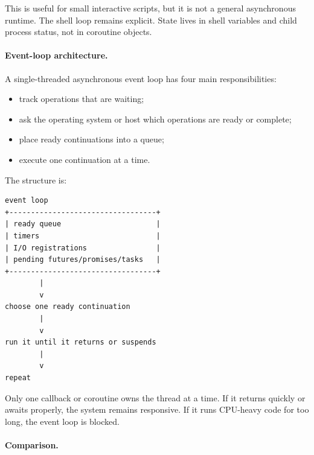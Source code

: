 This is useful for small interactive scripts, but it is not a general asynchronous runtime. The shell loop remains explicit. State lives in shell variables and child process status, not in coroutine objects.

\paragraph{Event-loop architecture.}

A single-threaded asynchronous event loop has four main responsibilities:

\begin{itemize}
    \item track operations that are waiting;
    \item ask the operating system or host which operations are ready or complete;
    \item place ready continuations into a queue;
    \item execute one continuation at a time.
\end{itemize}

The structure is:

\begin{verbatim}
event loop
+----------------------------------+
| ready queue                      |
| timers                           |
| I/O registrations                |
| pending futures/promises/tasks   |
+----------------------------------+
        |
        v
choose one ready continuation
        |
        v
run it until it returns or suspends
        |
        v
repeat
\end{verbatim}

Only one callback or coroutine owns the thread at a time. If it returns quickly or awaits properly, the system remains responsive. If it runs CPU-heavy code for too long, the event loop is blocked.

\paragraph{Comparison.}

